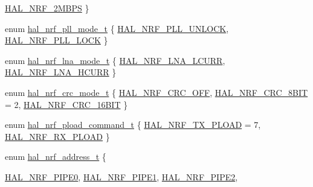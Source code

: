 \begin{DoxyCompactItemize}
\hyperlink{group__nordic__hal__nrf__reg_gga9539d7b988ef5ca3c6da9b89aca8b990a33d1afa4a93294924050247a78a2b88b}{HAL\_\-NRF\_\-2MBPS}
 \}
\item 
enum \hyperlink{group__nordic__hal__nrf__reg_ga8f0d40d735adcf593591c9aaefa3158a}{hal\_\-nrf\_\-pll\_\-mode\_\-t} \{ \hyperlink{group__nordic__hal__nrf__reg_gga8f0d40d735adcf593591c9aaefa3158aab6917877c23b8eb5fb0bc4abef22a4d7}{HAL\_\-NRF\_\-PLL\_\-UNLOCK}, 
\hyperlink{group__nordic__hal__nrf__reg_gga8f0d40d735adcf593591c9aaefa3158aa55ccef5e16d165e8531c895fa9471335}{HAL\_\-NRF\_\-PLL\_\-LOCK}
 \}
\item 
enum \hyperlink{group__nordic__hal__nrf__reg_gad1044c81af859b8c271bc274a5618161}{hal\_\-nrf\_\-lna\_\-mode\_\-t} \{ \hyperlink{group__nordic__hal__nrf__reg_ggad1044c81af859b8c271bc274a5618161a7f021d77caa1dcbf306b0933e3a8936d}{HAL\_\-NRF\_\-LNA\_\-LCURR}, 
\hyperlink{group__nordic__hal__nrf__reg_ggad1044c81af859b8c271bc274a5618161a22b96b249f68ad52df212557b6830066}{HAL\_\-NRF\_\-LNA\_\-HCURR}
 \}
\item 
enum \hyperlink{group__nordic__hal__nrf__reg_gacd3a5ef5248a2c075567e7f5d3d3a8e4}{hal\_\-nrf\_\-crc\_\-mode\_\-t} \{ \hyperlink{group__nordic__hal__nrf__reg_ggacd3a5ef5248a2c075567e7f5d3d3a8e4aa19a031caf125dd05c0ed7346429df12}{HAL\_\-NRF\_\-CRC\_\-OFF}, 
\hyperlink{group__nordic__hal__nrf__reg_ggacd3a5ef5248a2c075567e7f5d3d3a8e4a0b5ae051046cd14767f46a7917e756dc}{HAL\_\-NRF\_\-CRC\_\-8BIT} =  2, 
\hyperlink{group__nordic__hal__nrf__reg_ggacd3a5ef5248a2c075567e7f5d3d3a8e4a08f615321c73062499512d418ef90722}{HAL\_\-NRF\_\-CRC\_\-16BIT}
 \}
\item 
enum \hyperlink{group__nordic__hal__nrf__reg_gade11658f933ebe5fec8c9ce7bcace064}{hal\_\-nrf\_\-pload\_\-command\_\-t} \{ \hyperlink{group__nordic__hal__nrf__reg_ggade11658f933ebe5fec8c9ce7bcace064aa06e5716a0ab9e2309dffe2a812726cd}{HAL\_\-NRF\_\-TX\_\-PLOAD} =  7, 
\hyperlink{group__nordic__hal__nrf__reg_ggade11658f933ebe5fec8c9ce7bcace064aa65f1cb5b2a4f90764b534fc95afbfb8}{HAL\_\-NRF\_\-RX\_\-PLOAD}
 \}
\item 
enum \hyperlink{group__nordic__hal__nrf__reg_ga321d8cfbce9e410a49afac1f04cc2457}{hal\_\-nrf\_\-address\_\-t} \{ \par
\hyperlink{group__nordic__hal__nrf__reg_gga321d8cfbce9e410a49afac1f04cc2457aff2c3b92b44bbde577fd29a618fe9ffa}{HAL\_\-NRF\_\-PIPE0}, 
\hyperlink{group__nordic__hal__nrf__reg_gga321d8cfbce9e410a49afac1f04cc2457a40354d0d5e9b2c8e9dc8c6817f838f5d}{HAL\_\-NRF\_\-PIPE1}, 
\hyperlink{group__nordic__hal__nrf__reg_gga321d8cfbce9e410a49afac1f04cc2457ae484cef9b5604e89ccb885e3ad85b2c7}{HAL\_\-NRF\_\-PIPE2}, 

\end{DoxyCompactItemize}
